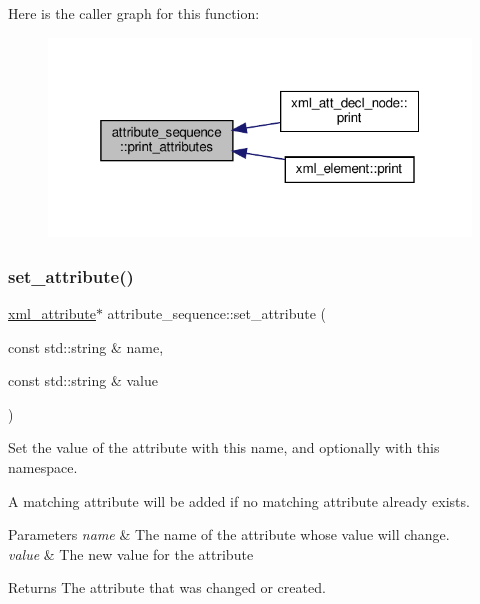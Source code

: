 Here is the caller graph for this function\+:
\nopagebreak
\begin{figure}[H]
\begin{center}
\leavevmode
\includegraphics[width=319pt]{de/d33/structattribute__sequence_a451d11624a55b8ea204e640013408538_icgraph}
\end{center}
\end{figure}
\mbox{\label{structattribute__sequence_a980d8d0966c1af614141536566d9ed62}} 
\subsubsection{\texorpdfstring{set\+\_\+attribute()}{set\_attribute()}}
{\footnotesize\ttfamily \hyperlink{classxml__attribute}{xml\+\_\+attribute}$\ast$ attribute\+\_\+sequence\+::set\+\_\+attribute (\begin{DoxyParamCaption}\item[{const std\+::string \&}]{name,  }\item[{const std\+::string \&}]{value }\end{DoxyParamCaption})\hspace{0.3cm}{\ttfamily [inline]}}



Set the value of the attribute with this name, and optionally with this namespace. 

A matching attribute will be added if no matching attribute already exists. 
\begin{DoxyParams}{Parameters}
{\em name} & The name of the attribute whose value will change. \\
\hline
{\em value} & The new value for the attribute \\
\hline
\end{DoxyParams}
\begin{DoxyReturn}{Returns}
The attribute that was changed or created. 
\end{DoxyReturn}


